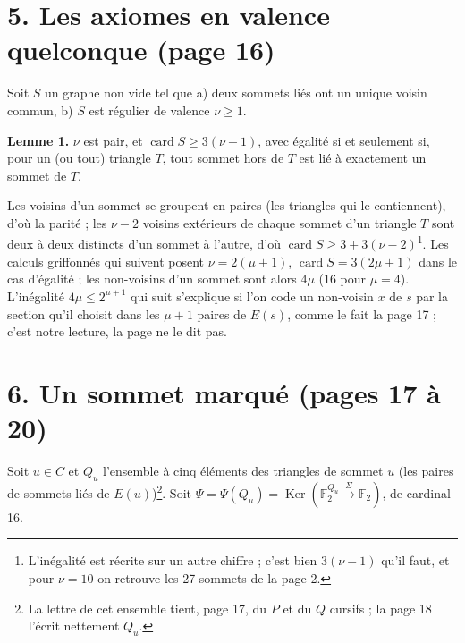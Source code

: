 \documentclass[11pt,a4paper]{article}
\begin{document}
\section*{5. Les axiomes en valence quelconque (page 16)}

Soit $S$ un graphe non vide tel que a) deux sommets liés ont un unique voisin
commun, b) $S$ est régulier de valence $\nu \geq 1$.

\textbf{Lemme 1.} $\nu$ est pair, et $\operatorname{card} S \geq 3(\nu - 1)$,
avec égalité si et seulement si, pour un (ou tout) triangle $T$, tout sommet
hors de $T$ est lié à exactement un sommet de $T$.

Les voisins d'un sommet se groupent en paires (les triangles qui le
contiennent), d'où la parité ; les $\nu - 2$ voisins extérieurs de chaque
sommet d'un triangle $T$ sont deux à deux distincts d'un sommet à l'autre, d'où
$\operatorname{card} S \geq 3 + 3(\nu - 2)$\footnote{L'inégalité est récrite
sur un autre chiffre ; c'est bien $3(\nu - 1)$ qu'il faut, et pour $\nu = 10$
on retrouve les 27 sommets de la page 2.}. Les calculs griffonnés qui suivent
posent $\nu = 2(\mu + 1)$, $\operatorname{card} S = 3(2\mu + 1)$ dans le cas
d'égalité ; les non-voisins d'un sommet sont alors $4\mu$ (16 pour $\mu = 4$).
L'inégalité $4\mu \leq 2^{\mu + 1}$ qui suit s'explique si l'on code un
non-voisin $x$ de $s$ par la section qu'il choisit dans les $\mu + 1$ paires de
$E(s)$, comme le fait la page 17 ; c'est notre lecture, la page ne le dit pas.

\section*{6. Un sommet marqué (pages 17 à 20)}

Soit $u \in C$ et $Q_u$ l'ensemble à cinq éléments des triangles de sommet $u$
(les paires de sommets liés de $E(u)$)\footnote{La lettre de cet ensemble
tient, page 17, du $P$ et du $Q$ cursifs ; la page 18 l'écrit nettement
$Q_u$.}. Soit $\Psi = \Psi(Q_u) = \operatorname{Ker}(\mathbb{F}_2^{Q_u}
\xrightarrow{\ \Sigma\ } \mathbb{F}_2)$, de cardinal 16.
\end{document}
